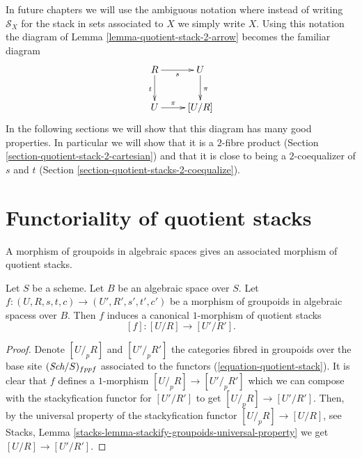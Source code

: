 \begin{remark}
\label{remark-fundamental-square}
In future chapters we will use the ambiguous notation where
instead of writing $\mathcal{S}_X$ for the stack in sets associated
to $X$ we simply write $X$. Using this notation the diagram of
Lemma \ref{lemma-quotient-stack-2-arrow}
becomes the familiar diagram
$$
\xymatrix{
R \ar[r]_s \ar[d]_t & U \ar[d]^\pi \\
U \ar[r]^-\pi & [U/R]
}
$$
In the following sections we will show that this diagram has
many good properties. In particular we will show that it is
a $2$-fibre product
(Section \ref{section-quotient-stack-2-cartesian})
and that it is close to being a $2$-coequalizer of $s$ and $t$
(Section \ref{section-quotient-stacks-2-coequalize}).
\end{remark}




\section{Functoriality of quotient stacks}
\label{section-functoriality-quotient-stacks}

\noindent
A morphism of groupoids in algebraic spaces gives an associated morphism
of quotient stacks.

\begin{lemma}
\label{lemma-quotient-stack-functorial}
Let $S$ be a scheme. Let $B$ be an algebraic space over $S$.
Let $f : (U, R, s, t, c) \to (U', R', s', t', c')$ be a morphism of
groupoids in algebraic spacess over $B$.
Then $f$ induces a canonical $1$-morphism of quotient stacks
$$
[f] : [U/R] \longrightarrow [U'/R'].
$$
\end{lemma}

\begin{proof}
Denote $[U/_{\!p}R]$ and $[U'/_{\!p}R']$ the categories fibred
in groupoids over the base site $(\textit{Sch}/S)_{fppf}$ associated to the
functors (\ref{equation-quotient-stack}). It is clear that $f$ defines
a $1$-morphism $[U/_{\!p}R] \to [U'/_{\!p}R']$ which we can compose
with the stackyfication functor for $[U'/R']$ to get $[U/_{\!p}R] \to [U'/R']$.
Then, by the universal property of the stackyfication functor
$[U/_{\!p}R] \to [U/R]$, see
Stacks, Lemma \ref{stacks-lemma-stackify-groupoids-universal-property}
we get $[U/R] \to [U'/R']$.
\end{proof}


